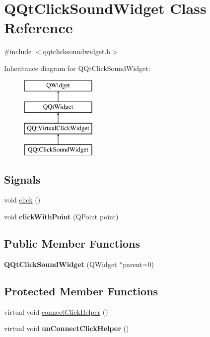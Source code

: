 \hypertarget{class_q_qt_click_sound_widget}{}\section{Q\+Qt\+Click\+Sound\+Widget Class Reference}
\label{class_q_qt_click_sound_widget}


{\ttfamily \#include $<$qqtclicksoundwidget.\+h$>$}

Inheritance diagram for Q\+Qt\+Click\+Sound\+Widget\+:\begin{figure}[H]
\begin{center}
\leavevmode
\includegraphics[height=4.000000cm]{class_q_qt_click_sound_widget}
\end{center}
\end{figure}
\subsection*{Signals}
\begin{DoxyCompactItemize}
\item 
void \mbox{\hyperlink{class_q_qt_click_sound_widget_a0135bb4d2366574b64f3ec2b81474d06}{click}} ()
\item 
\mbox{\label{class_q_qt_click_sound_widget_ae3addc615f0ccbb14f8019ffa16da0d4}} 
void {\bfseries click\+With\+Point} (Q\+Point point)
\end{DoxyCompactItemize}
\subsection*{Public Member Functions}
\begin{DoxyCompactItemize}
\item 
\mbox{\label{class_q_qt_click_sound_widget_a652a902d38da17fd58cef7f9a24a7d45}} 
{\bfseries Q\+Qt\+Click\+Sound\+Widget} (Q\+Widget $\ast$parent=0)
\end{DoxyCompactItemize}
\subsection*{Protected Member Functions}
\begin{DoxyCompactItemize}
\item 
virtual void \mbox{\hyperlink{class_q_qt_click_sound_widget_abca5602ca11fd5d9f6a4f26d8248e702}{connect\+Click\+Helper}} ()
\item 
\mbox{\label{class_q_qt_click_sound_widget_aec875dc2fc3ebfeafc0c7f134f1f086b}} 
virtual void {\bfseries un\+Connect\+Click\+Helper} ()
\end{DoxyCompactItemize}
